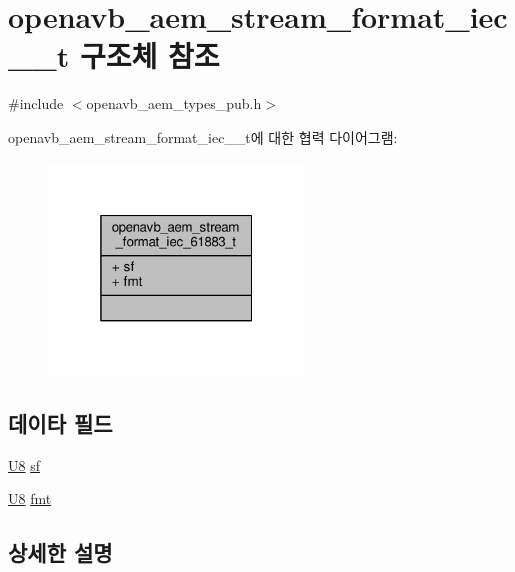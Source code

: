 \hypertarget{structopenavb__aem__stream__format__iec__61883__t}{}\section{openavb\+\_\+aem\+\_\+stream\+\_\+format\+\_\+iec\+\_\+\_\+t 구조체 참조}
\label{structopenavb__aem__stream__format__iec__61883__t}


{\ttfamily \#include $<$openavb\+\_\+aem\+\_\+types\+\_\+pub.\+h$>$}



openavb\+\_\+aem\+\_\+stream\+\_\+format\+\_\+iec\+\_\+\_\+t에 대한 협력 다이어그램\+:
\nopagebreak
\begin{figure}[H]
\begin{center}
\leavevmode
\includegraphics[width=193pt]{structopenavb__aem__stream__format__iec__61883__t__coll__graph}
\end{center}
\end{figure}
\subsection*{데이타 필드}
\begin{DoxyCompactItemize}
\item 
\hyperlink{openavb__types__base__pub_8h_aa63ef7b996d5487ce35a5a66601f3e73}{U8} \hyperlink{structopenavb__aem__stream__format__iec__61883__t_a153db177c2b7653917dff143e5f755e1}{sf}
\item 
\hyperlink{openavb__types__base__pub_8h_aa63ef7b996d5487ce35a5a66601f3e73}{U8} \hyperlink{structopenavb__aem__stream__format__iec__61883__t_ab88030d1822b822615cede2168f1c31e}{fmt}
\end{DoxyCompactItemize}


\subsection{상세한 설명}


